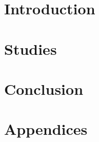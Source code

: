 \documentclass[a4paper,oneside,nobind]{thesis}
\begin{document}
%
\hypersetup{pageanchor=true}
\begin{romanpages}
\dominitoc %
\flushbottom
{
	\setlength{\baselineskip}{\frontmatterbaselineskip}
	\hypersetup{linkcolor=GREYDARK}
	\tableofcontents
	\listoffigures
	\mtcaddchapter
	\listoftables
	\mtcaddchapter
}
{
	\setlength{\baselineskip}{\frontmatterbaselineskip}
	
}

\end{romanpages}

\flushbottom


\pagestyle{fancybook}

\part{Introduction}
\setlength{\baselineskip}{1.5\frontmatterbaselineskip}

\label{part:intro}





\part{Studies}
\label{part:studies}


\part{Conclusion}
\label{part:discussion}

%

\part*{Appendices}


\end{document}
